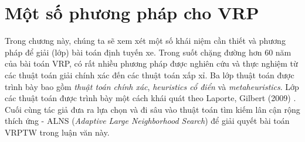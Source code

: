 \chapter{Một số phương pháp cho VRP}
\label{chap:solution}

Trong chương này, chúng ta sẽ xem xét một số khái niệm cần thiết và phương pháp để giải (lớp) bài toán định tuyến xe. Trong suốt chặng đường hơn 60 năm của bài toán VRP, có rất nhiều phương pháp được nghiên cứu và thực nghiệm từ các thuật toán giải chính xác đến các thuật toán xấp xỉ. Ba lớp thuật toán được trình bày bao gồm \textit{thuật toán chính xác}, \textit{heuristics cổ điển} và \textit{metaheuristics}. Lớp các thuật toán được trình bày một cách khái quát theo Laporte, Gilbert (2009) \cite{laporte2009fifty}. Cuối cùng tác giả đưa ra lựa chọn và đi sâu vào thuật toán tìm kiếm lân cận rộng thích ứng - ALNS (\textit{Adaptive Large Neighborhood Search}) để giải quyết bài toán VRPTW trong luận văn này.

